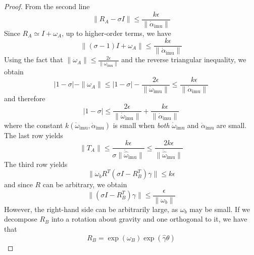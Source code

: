 \documentclass[]{article}
\def\w{\omega}
\def\hw{{\widehat\w}}
\def\imu{_\mathrm{imu}}
\begin{document}
\begin{proof}
From the second line
\begin{equation}
\| R_A - \sigma I \| \le \frac{k\epsilon}{\|\dot \alpha\imu  \|}
\end{equation}
Since $R_A %
\simeq I + \w_A$, up to higher-order terms, we have 
\begin{equation}
\| (\sigma-1) I + \w_A  \| \le \frac{k\epsilon}{\|\dot \alpha\imu  \|}
\end{equation}
Using the fact that $\| \w_A \| \le \frac{2\epsilon}{\| \dot \w\imu \|}$ and the reverse triangular inequality, we obtain
\begin{equation}
| 1 - \sigma| - \| \w_A\| \le | 1 - \sigma | - \frac{2\epsilon}{\| \dot \w\imu  \|} \le \frac{k \epsilon}{\| \dot \alpha\imu \|}
\end{equation}
and therefore
\begin{equation}
 |1 - \sigma| \le \frac{2\epsilon}{\| \dot \w\imu  \|} + \frac{k \epsilon}{\| \dot \alpha\imu \|} %
\end{equation}
where the constant $k(\dot \w\imu , \dot\alpha\imu )$ is small when {\em both} $\dot \w\imu $ and $\dot \alpha\imu $ are small.
The last row yields
\begin{equation}
\| T_A \| \le \frac{k \epsilon}{\sigma \| \ddot\hw\imu \|} \le \frac{2 k \epsilon}{ \| \ddot\hw\imu \|} %
\end{equation}
The third row yields
\begin{equation}
\| \w_b R^T(\sigma I - R_B^T)\gamma \| \le k \epsilon
\end{equation}
and since $R$ can be arbitrary, we obtain
\begin{equation}
\| (\sigma I - R_B^T)\gamma \| \le \frac{\epsilon }{\| \w_b \|}
\end{equation}
However, the right-hand side can be arbitrarily large, as $\w_b$ may be small. If we decompose $R_B$ into a rotation about gravity and one orthogonal to it, we have that 
\begin{equation}
R_B = \exp(\w_B) \exp(\widehat \gamma \theta)

\end{equation}
\end{proof}
\end{document}
